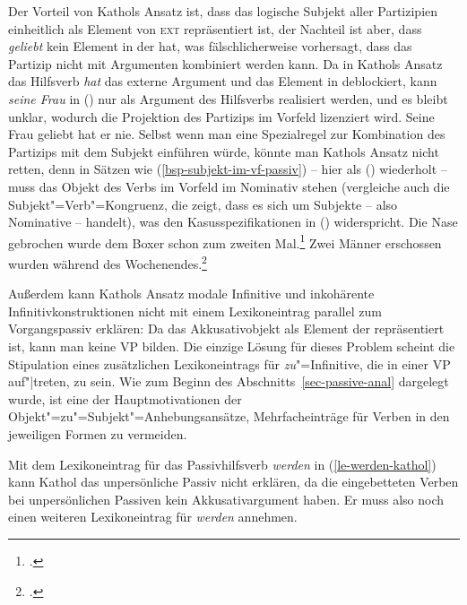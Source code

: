 {Der Vorteil von Kathols Ansatz ist, dass das logische Subjekt
aller Partizipien einheitlich als Element von \textsc{ext} repräsentiert ist,
der Nachteil ist aber, dass \emph{geliebt} kein Element in der \compsl hat,
was fälschlicherweise vorhersagt, dass das Partizip nicht mit Argumenten kombiniert
werden kann. Da in Kathols Ansatz das Hilfsverb \emph{hat} das externe Argument und das
Element in \subj deblockiert, kann \emph{seine Frau} in () nur als Argument des Hilfsverbs
realisiert werden, und es bleibt unklar, wodurch die Projektion des Partizips im Vorfeld
lizenziert wird.
\ea
Seine Frau geliebt hat er nie.
\z
Selbst wenn man eine Spezialregel zur Kombination des Partizips mit dem Subjekt einführen würde,
könnte man Kathols Ansatz nicht retten, denn in Sätzen wie (\ref{bsp-subjekt-im-vf-passiv}) -- hier als
() wiederholt -- muss das Objekt
des Verbs im Vorfeld im Nominativ stehen (vergleiche auch die Subjekt"=Verb"=Kongruenz, die zeigt,
dass es sich um Subjekte -- also Nominative -- handelt), was den Kasusspezifikationen in () widerspricht.
\eal
\label{bsp-subjekt-im-vf-passiv-zwei}
\ex{}
Die Nase gebrochen wurde dem Boxer schon zum zweiten Mal.\footnote{
        .
}
\ex{}
Zwei Männer erschossen wurden    während des Wochenendes.\footnote{
        .%
        }
\label{bsp-subjekt-im-vf-passiv-letzt-zwei}
\zl

\noindent
Außerdem kann Kathols Ansatz modale Infinitive 
und inkohärente Infinitivkonstruktionen nicht mit einem Lexikoneintrag parallel zum Vorgangspassiv
erklären:
Da das Akkusativobjekt als Element der \subjl repräsentiert ist, kann man keine VP
bilden. Die einzige Lösung für dieses Problem scheint die Stipulation eines zusätzlichen
Lexikoneintrags für \emph{zu}"=Infinitive, die in einer VP auf"|treten, zu sein.
Wie zum Beginn des Abschnitts~\ref{sec-passive-anal} dargelegt wurde, ist eine der Hauptmotivationen
der Objekt"=zu"=Subjekt"=Anhebungsansätze, Mehrfacheinträge für Verben in den jeweiligen
Formen zu vermeiden.

Mit dem Lexikoneintrag für das Passivhilfsverb \emph{werden} in (\ref{le-werden-kathol}) 
kann Kathol das unpersönliche Passiv nicht erklären, da die eingebetteten Verben bei unpersönlichen Passiven kein
Akkusativargument haben. Er muss also noch einen weiteren Lexikoneintrag für \emph{werden}
annehmen.

}

